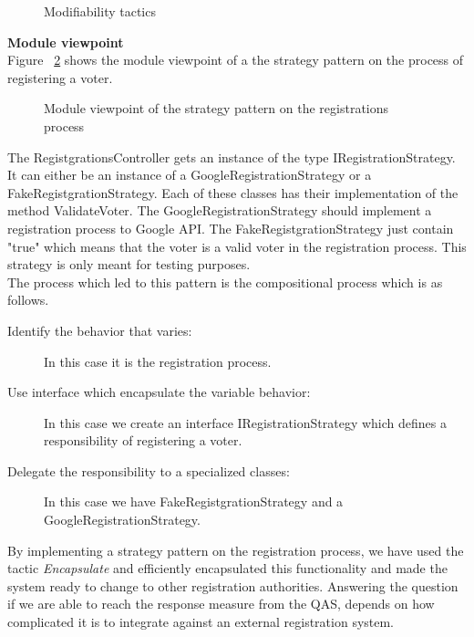 \begin{figure}[H]
\centering
  \caption{Modifiability tactics \cite{Bass}}   
  \label{fig:modifiability_tactic}
\end{figure}


\noindent
\textbf{Module viewpoint}\\
Figure ~\ref{fig:the_registrations_process} shows the module viewpoint of a the strategy pattern on the process of registering a voter.


\begin{figure}[H]
\centering
  \caption{Module viewpoint of the strategy pattern on the registrations process} 
   \label{fig:the_registrations_process}
\end{figure}
\noindent
The RegistgrationsController gets an instance of the type IRegistrationStrategy. It can either be an instance of a GoogleRegistrationStrategy or a FakeRegistgrationStrategy. Each of these classes has their implementation of the method ValidateVoter. The GoogleRegistrationStrategy should implement a registration process to Google API. The FakeRegistgrationStrategy just contain "true" which means that the voter is a valid voter in the registration process. This strategy is only meant for testing purposes. \\ 

\noindent
The process which led to this pattern is the compositional process which is as follows.

\begin{description}
    \item[Identify the behavior that varies:] In this case it is the registration process.  

    \item[Use interface which encapsulate the variable behavior:]  In this case we create an interface IRegistrationStrategy which defines a  responsibility of registering a voter.     
    
    \item[Delegate the responsibility to a specialized classes:] In this case we have FakeRegistgrationStrategy and a GoogleRegistrationStrategy.
\end{description}

\noindent
By implementing a strategy pattern on the registration process, we have used the tactic \textit{Encapsulate} and efficiently encapsulated this functionality and made the system ready to change to other registration authorities. Answering the question if we are able to reach the response measure from the QAS, depends on how complicated it is to integrate against an external registration system. 


